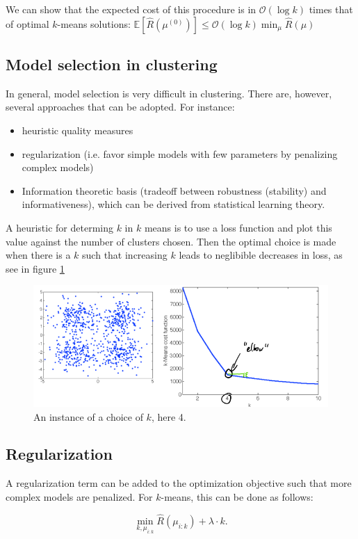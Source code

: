 \documentclass[a4paper,10pt,twoside]{article}
\begin{document}
We can show that the expected cost of this procedure is in $\mathcal{O}(\log{k})$ times that of optimal $k$-means solutions: $\mathbb{E}[\hat{R}(\mu^{(0)})]\leq\mathcal{O}(\log {k})\min_{\mu}\hat{R}(\mu)$

\subsection{Model selection in clustering}

In general, model selection is very difficult in clustering. There are, however, several approaches that can be adopted. For instance:
\begin{itemize}
    \item heuristic quality measures
    \item regularization (i.e. favor simple models with few parameters by penalizing complex models)
    \item Information theoretic basis (tradeoff between robustness (stability) and informativeness), which can be derived from statistical learning theory.
\end{itemize}

A heuristic for determing $k$ in $k$ means is to use a loss function and plot this value against the number of clusters chosen. Then the optimal choice is made when there is a $k$ such that increasing $k$ leads to neglibible decreases in loss, as see in figure \ref{choice-of-k}

\begin{figure}[]
    \centering
    \includegraphics[width=.5\textwidth]{figures/choice-of-k.png}
    \caption{An instance of a choice of $k$, here 4.}
    \label{choice-of-k}
\end{figure}

\subsection{Regularization}

A regularization term can be added to the optimization objective such that more complex models are penalized. For $k$-means, this can be done as follows:

\begin{equation*}
    \min_{k, \mu_{i:k}}\hat{R}(\mu_{i:k})+\lambda\cdot k.
\end{equation*}
\end{document}
